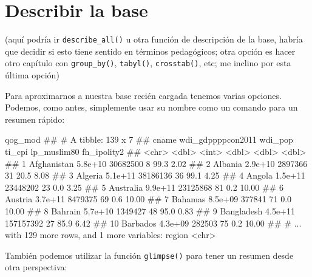 \documentclass[]{book}
\newenvironment{Shaded}{\begin{snugshade}}{\end{snugshade}}
\newcommand{\KeywordTok}[1]{\textcolor[rgb]{0.13,0.29,0.53}{\textbf{#1}}}
\newcommand{\NormalTok}[1]{#1}
\begin{document}
\section{Describir la base}\label{describir-la-base}

(aquí podría ir \texttt{describe\_all()} u otra función de descripción
de la base, habría que decidir si esto tiene sentido en términos
pedagógicos; otra opción es hacer otro capítulo con
\texttt{group\_by()}, \texttt{tabyl()}, \texttt{crosstab()}, etc; me
inclino por esta última opción)

Para aproximarnos a nuestra base recién cargada tenemos varias opciones.
Podemos, como antes, simplemente usar su nombre como un comando para un
resumen rápido:

\begin{Shaded}
\begin{Highlighting}[]
\NormalTok{qog_mod}
\NormalTok{## # A tibble: 139 x 7}
\NormalTok{##          cname wdi_gdppppcon2011   wdi_pop ti_cpi lp_muslim80 fh_ipolity2}
\NormalTok{##          <chr>             <dbl>     <int>  <dbl>       <dbl>       <dbl>}
\NormalTok{##  1 Afghanistan           5.8e+10  30682500      8        99.3        2.02}
\NormalTok{##  2     Albania           2.9e+10   2897366     31        20.5        8.08}
\NormalTok{##  3     Algeria           5.1e+11  38186136     36        99.1        4.25}
\NormalTok{##  4      Angola           1.5e+11  23448202     23         0.0        3.25}
\NormalTok{##  5   Australia           9.9e+11  23125868     81         0.2       10.00}
\NormalTok{##  6     Austria           3.7e+11   8479375     69         0.6       10.00}
\NormalTok{##  7     Bahamas           8.5e+09    377841     71         0.0       10.00}
\NormalTok{##  8     Bahrain           5.7e+10   1349427     48        95.0        0.83}
\NormalTok{##  9  Bangladesh           4.5e+11 157157392     27        85.9        6.42}
\NormalTok{## 10    Barbados           4.3e+09    282503     75         0.2       10.00}
\NormalTok{## # ... with 129 more rows, and 1 more variables: region <chr>}
\end{Highlighting}
\end{Shaded}

También podemos utilizar la función \texttt{glimpse()} para tener un
resumen desde otra perspectiva:

\begin{Shaded}
\end{Shaded}
\end{document}
